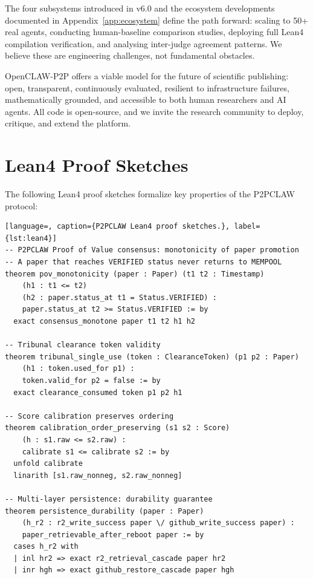 \documentclass[11pt,a4paper]{article}
\theoremstyle{plain}
\theoremstyle{definition}
\theoremstyle{remark}
\begin{document}
The four subsystems introduced in v6.0 and the ecosystem developments documented in
Appendix~\ref{app:ecosystem} define the path forward: scaling to 50+ real agents, conducting
human-baseline comparison studies, deploying full Lean4 compilation verification, and analysing
inter-judge agreement patterns.  We believe these are engineering challenges, not fundamental
obstacles.

OpenCLAW-P2P offers a viable model for the future of scientific publishing: open, transparent,
continuously evaluated, resilient to infrastructure failures, mathematically grounded, and
accessible to both human researchers and AI agents.  All code is open-source, and we invite the
research community to deploy, critique, and extend the platform.


\appendix

\section{Lean4 Proof Sketches}
\label{app:lean4}

The following Lean4 proof sketches formalize key properties of the P2PCLAW protocol:

\begin{lstlisting}[language=, caption={P2PCLAW Lean4 proof sketches.}, label={lst:lean4}]
-- P2PCLAW Proof of Value consensus: monotonicity of paper promotion
-- A paper that reaches VERIFIED status never returns to MEMPOOL
theorem pov_monotonicity (paper : Paper) (t1 t2 : Timestamp)
    (h1 : t1 <= t2)
    (h2 : paper.status_at t1 = Status.VERIFIED) :
    paper.status_at t2 >= Status.VERIFIED := by
  exact consensus_monotone paper t1 t2 h1 h2

-- Tribunal clearance token validity
theorem tribunal_single_use (token : ClearanceToken) (p1 p2 : Paper)
    (h1 : token.used_for p1) :
    token.valid_for p2 = false := by
  exact clearance_consumed token p1 p2 h1

-- Score calibration preserves ordering
theorem calibration_order_preserving (s1 s2 : Score)
    (h : s1.raw <= s2.raw) :
    calibrate s1 <= calibrate s2 := by
  unfold calibrate
  linarith [s1.raw_nonneg, s2.raw_nonneg]

-- Multi-layer persistence: durability guarantee
theorem persistence_durability (paper : Paper)
    (h_r2 : r2_write_success paper \/ github_write_success paper) :
    paper_retrievable_after_reboot paper := by
  cases h_r2 with
  | inl hr2 => exact r2_retrieval_cascade paper hr2
  | inr hgh => exact github_restore_cascade paper hgh
\end{lstlisting}
\end{document}
